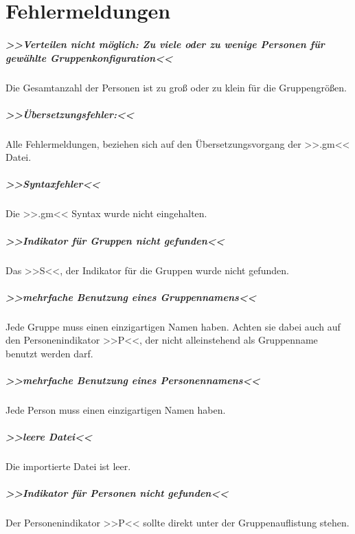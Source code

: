 \chapter{Fehlermeldungen}
\label{ch:fehlermeldungen}

\paragraph{>>Verteilen nicht möglich: Zu viele oder zu wenige Personen für gewählte Gruppenkonfiguration<<} Die Gesamtanzahl der Personen ist zu groß oder zu klein für die Gruppengrößen.

\paragraph{>>Übersetzungsfehler:<<} Alle Fehlermeldungen, beziehen sich auf den Übersetzungsvorgang der >>.gm<< Datei.

\paragraph{>>Syntaxfehler<<} Die >>.gm<< Syntax wurde nicht eingehalten.

\paragraph{>>Indikator für Gruppen nicht gefunden<<} Das >>S<<, der Indikator für die Gruppen wurde nicht gefunden.

\paragraph{>>mehrfache Benutzung eines Gruppennamens<<} Jede Gruppe muss einen einzigartigen Namen haben. Achten sie dabei auch auf den Personenindikator >>P<<, der nicht alleinstehend als Gruppenname benutzt werden darf.

\paragraph{>>mehrfache Benutzung eines Personennamens<<} Jede Person muss einen einzigartigen Namen haben.

\paragraph{>>leere Datei<<} Die importierte Datei ist leer.

\paragraph{>>Indikator für Personen nicht gefunden<<} Der Personenindikator >>P<< sollte direkt unter der Gruppenauflistung stehen.

